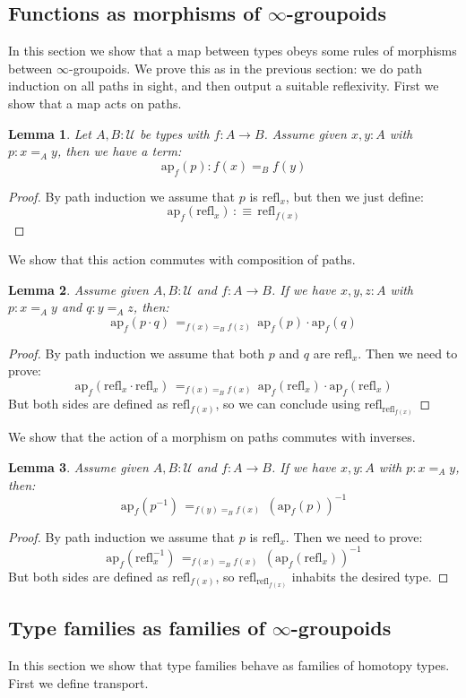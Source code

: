 \documentclass{article}
\newcommand{\sse}[1]{\medbreak \subsection{#1}}
\newcommand{\U}{{\mathcal U}}
\renewcommand{\r}{\rightarrow}
\newcommand{\ap}{\mathrm{ap}}
\newcommand{\refl}{\mathrm{refl}}
\newtheorem{lemma}{Lemma}
\begin{document}
\sse{Functions as morphisms of $\infty$-groupoids}

In this section we show that a map between types obeys some rules of morphisms between $\infty$-groupoids. %
We prove this as in the previous section: we do path induction on all paths in sight, and then output a suitable reflexivity. First we show that a map acts on paths.

\begin{lemma}
Let $A,B:\U$ be types with $f:A\r B$. Assume given $x,y:A$ with $p:x=_Ay$, then we have a term:
\[\ap_f(p) : f(x)=_B f(y)\]
\end{lemma}
\begin{proof}
By path induction we assume that $p$ is $\refl_x$, but then we just define:
\[\ap_f(\refl_x) \, :\equiv\, \refl_{f(x)}\]
\end{proof}

We show that this action commutes with composition of paths.

\begin{lemma}
Assume given $A,B:\U$ and $f:A\r B$. If we have $x,y,z:A$ with $p:x=_Ay$ and $q:y=_Az$, then:
\[\ap_f(p\cdot q) \, =_{f(x)=_Bf(z)}\, \ap_f(p)\cdot\ap_f(q)\]
\end{lemma}
\begin{proof}
By path induction we assume that both $p$ and $q$ are $\refl_x$. Then we need to prove:
\[\ap_f(\refl_x\cdot \refl_x) \,=_{f(x)=_Bf(x)}\, \ap_f(\refl_x)\cdot\ap_f(\refl_x)\]
But both sides are defined as $\refl_{f(x)}$, so we can conclude using $\refl_{\refl_{f(x)}}$
\end{proof}

We show that the action of a morphism on paths commutes with inverses.

\begin{lemma}
Assume given $A,B:\U$ and $f:A\r B$. If we have $x,y:A$ with $p:x=_Ay$, then:
\[\ap_f(p^{-1})\, =_{f(y)=_Bf(x)}\, (\ap_f(p))^{-1}\]
\end{lemma}
\begin{proof}
By path induction we assume that $p$ is $\refl_x$. Then we need to prove:
\[\ap_f(\refl_x^{-1})\, =_{f(x)=_Bf(x)}\, (\ap_f(\refl_x))^{-1}\]
But both sides are defined as $\refl_{f(x)}$, so $\refl_{\refl_{f(x)}}$ inhabits the desired type.
\end{proof}



\sse{Type families as families of $\infty$-groupoids}

In this section we show that type families behave as families of homotopy types. First we define transport.
\end{document}
